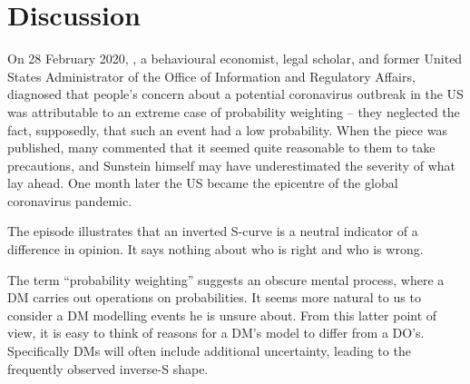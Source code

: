 \documentclass[a4paper, 12pt]{article}
\newcommand{\secref}[1]{Sec.~\ref{sec:#1}}
\newcommand{\ie}{{\it i.e.}\ }
\newcommand{\MK}[1]{\textcolor{red}{\textit{***MK: #1 MK***}}}
\newcommand{\OP}[1]{{\it ***OP: #1 OP***}}
\begin{document}
\newpage
\section{Discussion}
On 28 February 2020, \citet{Sunstein2020}, a behavioural economist, legal scholar, and former United States Administrator of the Office of Information and Regulatory Affairs, diagnosed that people's concern about a potential coronavirus outbreak in the US was attributable to an extreme case of probability weighting -- they neglected the fact, supposedly, that such an event had a low probability. When the piece was published, many commented that it seemed quite reasonable to them to take precautions, and Sunstein himself may have underestimated the severity of what lay ahead. One month later the US became the epicentre of the global coronavirus pandemic.

The episode illustrates that an inverted S-curve is a neutral indicator of a difference in opinion. It says nothing about who is right and who is wrong.

The term ``probability weighting'' suggests an obscure mental process, where a DM carries out operations on probabilities. It seems more natural to us to consider a DM modelling events he is unsure about. From this latter point of view, it is easy to think of reasons for a DM's model to differ from a DO's. Specifically DMs will often include additional uncertainty, leading to the frequently observed inverse-S shape.


 
\end{document}
